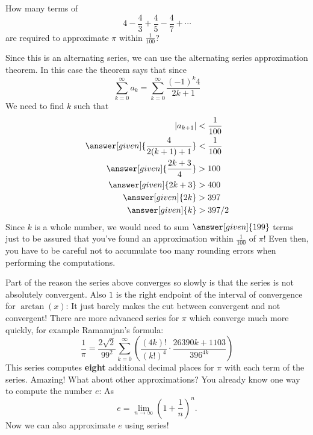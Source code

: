 \documentclass{ximera}
\begin{document}
\begin{example}
  How many terms of
  \[
  4-\frac{4}{3}+\frac{4}{5}-\frac{4}{7}+\cdots
  \]
  are required to approximate $\pi$ within $\frac{1}{100}$?
  \begin{explanation}
    Since this is an alternating series, we can use the alternating
    series approximation theorem. In this case the theorem says that
    since
    \[
    \sum_{k=0}^\infty a_k = \sum_{k=0}^\infty \frac{(-1)^k4}{2k+1}
    \]
    We need to find $k$ such that
    \begin{align*}
      |a_{k+1}| &<\frac{1}{100}\\
      \answer[given]{\frac{4}{2(k+1)+1}} &< \frac{1}{100}\\
      \answer[given]{\frac{2k+3}{4}} &> 100\\
      \answer[given]{2k+3} &> 400\\
      \answer[given]{2k} &> 397\\
      \answer[given]{k} &> 397/2
    \end{align*}
    Since $k$ is a whole number, we would need to sum
    $\answer[given]{199}$ terms just to be assured that you've found
    an approximation within $\frac{1}{100}$ of $\pi$! Even then, you
    have to be careful not to accumulate too many rounding errors when
    performing the computations.
  \end{explanation}
\end{example}


Part of the reason the series above converges so slowly is that the
series is not absolutely convergent.  Also $1$ is the right endpoint
of the interval of convergence for $\arctan(x)$: It just barely makes
the cut between convergent and not convergent! There are more advanced
series for $\pi$ which converge much more quickly, for example
Ramanujan's formula:
\[
\frac{1}{\pi} = \frac{2 \sqrt 2}{99^2} \sum_{k=0}^\infty \left(\frac{(4k)!}{(k!)^4} \cdot \frac{26390k+1103}{396^{4k}}\right)
\]
This series computes \textbf{eight} additional decimal places for
$\pi$ with each term of the series. Amazing! What about other
approximations?  You already know one way to compute the number $e$:
As
\[
e = \lim_{n\to \infty} \left( 1+\frac{1}{n}\right)^n.
\]
Now we can also approximate $e$ using series!
\end{document}
